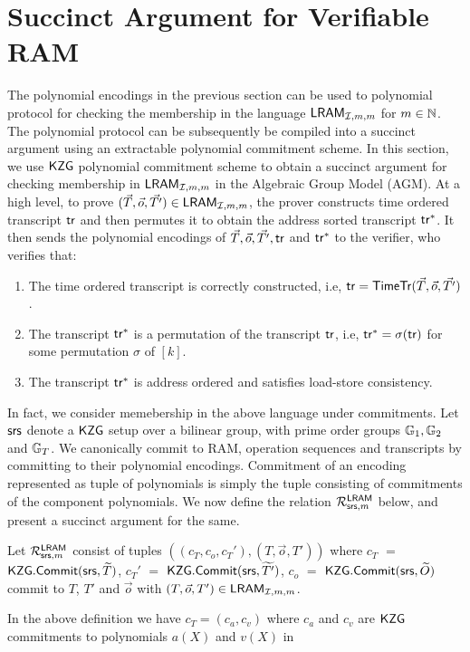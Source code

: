 \section{Succinct Argument for Verifiable RAM}\label{sec:poly-proto-ram}
The polynomial encodings in the previous section can be used to polynomial protocol for
checking the membership in the language $\mathsf{LRAM}_{\mathcal{I},m,m}$ for $m\in \mathbb{N}$. The polynomial protocol can be subsequently
be compiled into a succinct argument using an extractable polynomial commitment scheme.
In this section, we use $\mathsf{KZG}$ polynomial commitment scheme to obtain a succinct argument for checking membership in $\mathsf{LRAM}_{\mathcal{I},m,m}$
in the Algebraic Group Model (AGM).
At a high level, to prove $(\vec{T},\vec{o},\vec{T'})\in \mathsf{LRAM}_{\mathcal{I},m,m}$, the prover
constructs time ordered transcript $\mathsf{tr}$ and then permutes it to obtain the address sorted transcript $\mathsf{tr}^\ast$.
It then sends the polynomial encodings of $\vec{T},\vec{o},\vec{T'},\mathsf{tr}$ and $\mathsf{tr}^\ast$ to the verifier, who verifies that:
\begin{enumerate}[leftmargin=1em]
    \item The time ordered transcript is correctly constructed, i.e, $\mathsf{tr}=\mathsf{TimeTr}(\vec{T},\vec{o},\vec{T'})$.
    \item The transcript $\mathsf{tr}^\ast$ is a permutation of the transcript $\mathsf{tr}$, i.e, $\mathsf{tr}^\ast=\sigma(\mathsf{tr})$ for some permutation $\sigma$ of $[k]$.
    \item The transcript $\mathsf{tr}^\ast$ is address ordered and satisfies load-store consistency.
\end{enumerate}
In fact, we consider memebership in the above language under commitments. Let $\mathsf{srs}$ denote a $\mathsf{KZG}$ setup over a bilinear group, with
prime order groups $\mathbb{G}_1, \mathbb{G}_2$ and $\mathbb{G}_T$. We canonically commit to RAM, operation sequences and transcripts by committing to their
polynomial encodings. Commitment of an encoding represented as tuple of polynomials is simply the tuple consisting of commitments of the component
polynomials. We now define
the relation $\mathcal{R}^{\mathsf{LRAM}}_{\mathsf{srs},m}$ below, and present a succinct argument for the same.
\begin{definition}\label{defn:committed-vram}
Let $\mathcal{R}^{\mathsf{LRAM}}_{\mathsf{srs},m}$ consist of tuples $((c_T, c_o, c_T'), (T, \vec{o},T'))$ where $c_T$ $=$ $\mathsf{KZG.Commit}(\mathsf{srs}, \widetilde{T})$,
$c_T'$ $=$ $\mathsf{KZG.Commit}(\mathsf{srs}, \widetilde{T'})$,
$c_o$ $=$ $\mathsf{KZG.Commit}(\mathsf{srs},\widetilde{O})$ commit to $T$, $T'$ and $\vec{o}$ with $(T,\vec{o},T')\in \mathsf{LRAM}_{\mathcal{I},m,m}$.
\end{definition}
\noindent In the above definition we have $c_T=(c_a,c_v)$ where $c_a$ and $c_v$ are $\mathsf{KZG}$ commitments to polynomials $a(X)$ and $v(X)$ in
